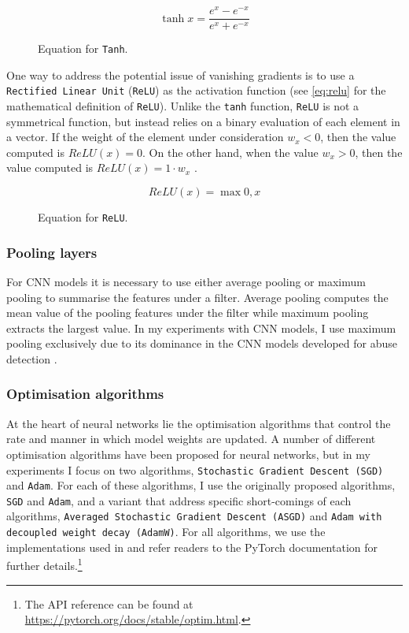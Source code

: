 \begin{figure}[h]
  \begin{equation}\label{eq:tanh}
    \tanh{x} = \dfrac{e^x - e^{-x}}{e^x + e^{-x}} 
  \end{equation}
  \caption{Equation for \texttt{Tanh}.}
\end{figure}

One way to address the potential issue of vanishing gradients is to use a \texttt{Rectified Linear Unit} (\texttt{ReLU}) as the activation function (see \cref{eq:relu} for the mathematical definition of \texttt{ReLU}). Unlike the \texttt{tanh} function, \texttt{ReLU} is not a symmetrical function, but instead relies on a binary evaluation of each element in a vector. If the weight of the element under consideration $w_x < 0$, then the value computed is $\mathit{ReLU}(x) = 0$. On the other hand, when the value $w_x > 0$, then the value computed is $\mathit{ReLU}(x) = 1 \cdot w_x$ \citep{Teuwen:2020}.

\begin{figure}[h]
  \begin{equation}\label{eq:relu}
    \mathit{ReLU (x)} = \max{0, x}
  \end{equation}
  \caption{Equation for \texttt{ReLU}.}
\end{figure}

\subsubsection{Pooling layers}

For CNN models it is necessary to use either average pooling or maximum pooling to summarise the features under a filter. Average pooling computes the mean value of the pooling features under the filter while maximum pooling extracts the largest value. In my experiments with CNN models, I use maximum pooling exclusively due to its dominance in the CNN models developed for abuse detection \citep{CNN with max pooling papers}.

\subsubsection{Optimisation algorithms}

At the heart of neural networks lie the optimisation algorithms that control the rate and manner in which model weights are updated. A number of different optimisation algorithms have been proposed for neural networks, but in my experiments I focus on two algorithms, \texttt{Stochastic Gradient Descent (SGD)} and \texttt{Adam}. For each of these algorithms, I use the originally proposed algorithms, \texttt{SGD} and \texttt{Adam}, and a variant that address specific short-comings of each algorithms, \texttt{Averaged Stochastic Gradient Descent (ASGD)} and \texttt{Adam with decoupled weight decay (AdamW)}. For all algorithms, we use the implementations used in \citet{Pazske:2019} and refer readers to the PyTorch documentation for further details.\footnote{The API reference can be found at \url{https://pytorch.org/docs/stable/optim.html}.}

